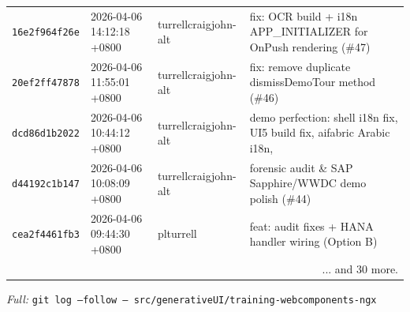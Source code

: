 \documentclass[11pt,a4paper]{article}
\begin{document}
\begin{longtable}{|p{2.2cm}|p{3.2cm}|l|p{6cm}|}
\texttt{16e2f964f26e} & 2026-04-06 14:12:18 +0800 & turrellcraigjohn-alt & fix: OCR build + i18n APP\_INITIALIZER for OnPush rendering (\#47) \\
\texttt{20ef2ff47878} & 2026-04-06 11:55:01 +0800 & turrellcraigjohn-alt & fix: remove duplicate dismissDemoTour method (\#46) \\
\texttt{dcd86d1b2022} & 2026-04-06 10:44:12 +0800 & turrellcraigjohn-alt & demo perfection: shell i18n fix, UI5 build fix, aifabric Arabic i18n,  \\
\texttt{d44192c1b147} & 2026-04-06 10:08:09 +0800 & turrellcraigjohn-alt & forensic audit \& SAP Sapphire/WWDC demo polish (\#44) \\
\texttt{cea2f4461fb3} & 2026-04-06 09:44:30 +0800 & plturrell & feat: audit fixes + HANA handler wiring (Option B) \\
\hline
\multicolumn{4}{r}{... and 30 more.} \\ \hline
\end{longtable}
\textit{Full:} \texttt{git log --follow -- src/generativeUI/training-webcomponents-ngx}
\end{document}
